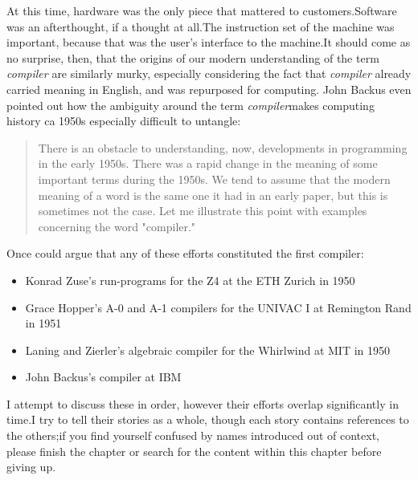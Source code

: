 At this time, hardware was the only piece that mattered to customers.Software
was an afterthought, if a thought at all.The instruction set of the machine was
important, because that was the user's interface to the machine.It should come
as no surprise, then, that the origins of our modern understanding of the term
\textit{compiler} are similarly murky, especially considering the fact that
\textit{compiler} already carried meaning in English, and was repurposed for
computing. John Backus even pointed out how the ambiguity around the term
\textit{compiler}makes computing history ca 1950s especially difficult to
untangle:
\begin{quotation}
  There is an obstacle to understanding, now, developments in
  programming in the early 1950s. There was a rapid change in the
  meaning of some important terms during the 1950s. We tend to assume
  that the modern meaning of a word is the same one it had in an early
  paper, but this is sometimes not the case. Let me illustrate this
  point with examples concerning the word "compiler."
  \cite{Backus_1980_Programming_in_America_in_1950s}
\end{quotation}
\bigskip
Once could argue that any of these efforts constituted the first compiler:
\begin{itemize}
  \item Konrad Zuse's run-programs for the Z4 at the ETH Zurich in 1950
  \item Grace Hopper's A-0 and A-1 compilers for the UNIVAC I at
    Remington Rand in 1951
  \item Laning and Zierler's algebraic compiler for the Whirlwind at MIT in 1950
  \item John Backus's \FTNI{} compiler at IBM
\end{itemize}

I attempt to discuss these in order, however their efforts overlap
significantly in time.I try to tell their stories as a whole, though each story
contains references to the others;if you find yourself confused by names
introduced out of context, please finish the chapter or search for the content
within this chapter before giving up.

